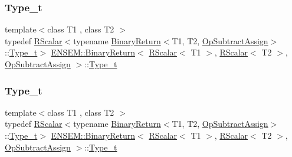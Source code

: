 \subsubsection{\texorpdfstring{Type\_t}{Type\_t}\hspace{0.1cm}{\footnotesize\ttfamily [2/3]}}
{\footnotesize\ttfamily template$<$class T1 , class T2 $>$ \\
typedef \mbox{\hyperlink{classENSEM_1_1RScalar}{R\+Scalar}}$<$typename \mbox{\hyperlink{structENSEM_1_1BinaryReturn}{Binary\+Return}}$<$T1, T2, \mbox{\hyperlink{structENSEM_1_1OpSubtractAssign}{Op\+Subtract\+Assign}}$>$\+::\mbox{\hyperlink{structENSEM_1_1BinaryReturn_3_01RScalar_3_01T1_01_4_00_01RScalar_3_01T2_01_4_00_01OpSubtractAssign_01_4_a21cc9f64f35d92dbf0a0560a7c7d6c28}{Type\+\_\+t}}$>$ \mbox{\hyperlink{structENSEM_1_1BinaryReturn}{E\+N\+S\+E\+M\+::\+Binary\+Return}}$<$ \mbox{\hyperlink{classENSEM_1_1RScalar}{R\+Scalar}}$<$ T1 $>$, \mbox{\hyperlink{classENSEM_1_1RScalar}{R\+Scalar}}$<$ T2 $>$, \mbox{\hyperlink{structENSEM_1_1OpSubtractAssign}{Op\+Subtract\+Assign}} $>$\+::\mbox{\hyperlink{structENSEM_1_1BinaryReturn_3_01RScalar_3_01T1_01_4_00_01RScalar_3_01T2_01_4_00_01OpSubtractAssign_01_4_a21cc9f64f35d92dbf0a0560a7c7d6c28}{Type\+\_\+t}}}

\mbox{\label{structENSEM_1_1BinaryReturn_3_01RScalar_3_01T1_01_4_00_01RScalar_3_01T2_01_4_00_01OpSubtractAssign_01_4_a21cc9f64f35d92dbf0a0560a7c7d6c28}} 
\subsubsection{\texorpdfstring{Type\_t}{Type\_t}\hspace{0.1cm}{\footnotesize\ttfamily [3/3]}}
{\footnotesize\ttfamily template$<$class T1 , class T2 $>$ \\
typedef \mbox{\hyperlink{classENSEM_1_1RScalar}{R\+Scalar}}$<$typename \mbox{\hyperlink{structENSEM_1_1BinaryReturn}{Binary\+Return}}$<$T1, T2, \mbox{\hyperlink{structENSEM_1_1OpSubtractAssign}{Op\+Subtract\+Assign}}$>$\+::\mbox{\hyperlink{structENSEM_1_1BinaryReturn_3_01RScalar_3_01T1_01_4_00_01RScalar_3_01T2_01_4_00_01OpSubtractAssign_01_4_a21cc9f64f35d92dbf0a0560a7c7d6c28}{Type\+\_\+t}}$>$ \mbox{\hyperlink{structENSEM_1_1BinaryReturn}{E\+N\+S\+E\+M\+::\+Binary\+Return}}$<$ \mbox{\hyperlink{classENSEM_1_1RScalar}{R\+Scalar}}$<$ T1 $>$, \mbox{\hyperlink{classENSEM_1_1RScalar}{R\+Scalar}}$<$ T2 $>$, \mbox{\hyperlink{structENSEM_1_1OpSubtractAssign}{Op\+Subtract\+Assign}} $>$\+::\mbox{\hyperlink{structENSEM_1_1BinaryReturn_3_01RScalar_3_01T1_01_4_00_01RScalar_3_01T2_01_4_00_01OpSubtractAssign_01_4_a21cc9f64f35d92dbf0a0560a7c7d6c28}{Type\+\_\+t}}}



